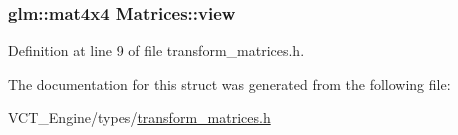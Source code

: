 \hypertarget{struct_matrices_af1345e145e678b3430cb794fb25b86ce}{}
\subsubsection[{view}]{\setlength{\rightskip}{0pt plus 5cm}glm\+::mat4x4 Matrices\+::view}\label{struct_matrices_af1345e145e678b3430cb794fb25b86ce}


Definition at line 9 of file transform\+\_\+matrices.\+h.



The documentation for this struct was generated from the following file\+:\begin{DoxyCompactItemize}
\item 
V\+C\+T\+\_\+\+Engine/types/\hyperlink{transform__matrices_8h}{transform\+\_\+matrices.\+h}\end{DoxyCompactItemize}
